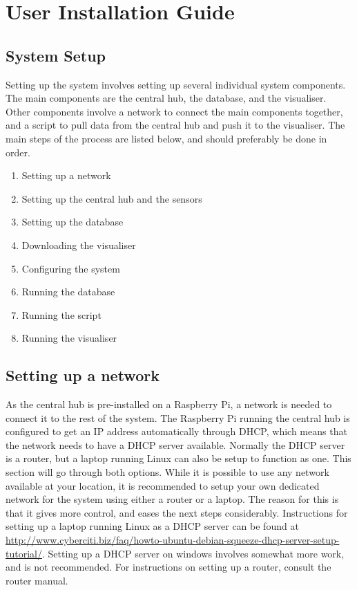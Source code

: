 \documentclass[../document.tex]{subfiles}
\begin{document}
\section{User Installation Guide}

\subsection{System Setup}
Setting up the system involves setting up several individual system components. The main components are the central hub, the database, and the visualiser. Other components involve a network to connect the main components together, and a script to pull data from the central hub and push it to the visualiser. The main steps of the process are listed below, and should preferably be done in order.
\begin{enumerate}
\item Setting up a network

\item Setting up the central hub and the sensors

\item Setting up the database

\item Downloading the visualiser

\item Configuring the system

\item Running the database
\item Running the script
\item Running the visualiser
\end{enumerate}



\subsection{Setting up a network}
As the central hub is pre-installed on a \gls{Raspberry Pi}, a network is needed to connect it to the rest of the system. The \gls{Raspberry Pi} running the central hub is configured to get an IP address automatically through \gls{DHCP}, which means that the network needs to have a \gls{DHCP} server available. Normally the \gls{DHCP} server is a router, but a laptop running Linux can also be setup to function as one. This section will go through both options. While it is possible to use any network available at your location, it is recommended to setup your own dedicated network for the system using either a router or a laptop. The reason for this is that it gives more control, and eases the next steps considerably. Instructions for setting up a laptop running Linux as a \gls{DHCP} server can be found at \url{http://www.cyberciti.biz/faq/howto-ubuntu-debian-squeeze-dhcp-server-setup-tutorial/}. Setting up a \gls{DHCP} server on windows involves somewhat more work, and is not recommended. For instructions on setting up a router, consult the router manual.
\end{document}
